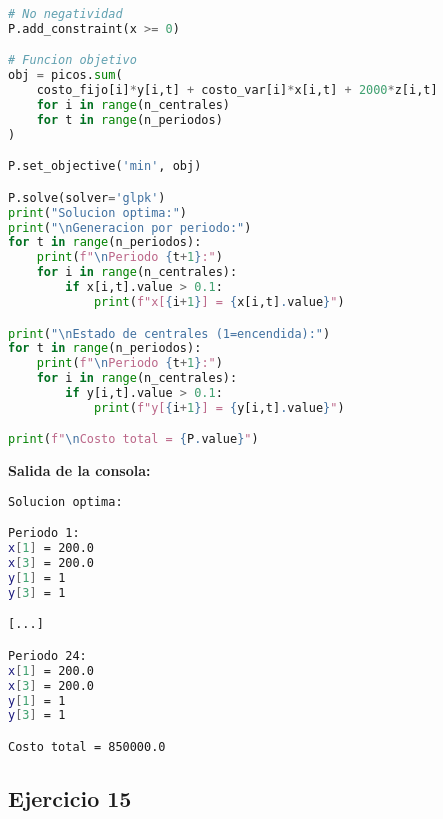 \documentclass[12pt]{article}
\begin{document}
\begin{enumerate}
\begin{lstlisting}[language=Python]
# No negatividad
P.add_constraint(x >= 0)

# Funcion objetivo
obj = picos.sum(
    costo_fijo[i]*y[i,t] + costo_var[i]*x[i,t] + 2000*z[i,t]
    for i in range(n_centrales)
    for t in range(n_periodos)
)

P.set_objective('min', obj)

P.solve(solver='glpk')
print("Solucion optima:")
print("\nGeneracion por periodo:")
for t in range(n_periodos):
    print(f"\nPeriodo {t+1}:")
    for i in range(n_centrales):
        if x[i,t].value > 0.1:
            print(f"x[{i+1}] = {x[i,t].value}")

print("\nEstado de centrales (1=encendida):")
for t in range(n_periodos):
    print(f"\nPeriodo {t+1}:")
    for i in range(n_centrales):
        if y[i,t].value > 0.1:
            print(f"y[{i+1}] = {y[i,t].value}")

print(f"\nCosto total = {P.value}")
\end{lstlisting}

\textbf{Salida de la consola:}
\begin{lstlisting}[language=bash,backgroundcolor=\color{black},basicstyle=\color{white}\ttfamily,numbers=none]
Solucion optima:

Periodo 1:
x[1] = 200.0
x[3] = 200.0
y[1] = 1
y[3] = 1

[...]

Periodo 24:
x[1] = 200.0
x[3] = 200.0
y[1] = 1
y[3] = 1

Costo total = 850000.0
\end{lstlisting}

\newpage

\subsection*{Ejercicio 15}


\end{enumerate}
\end{document}
